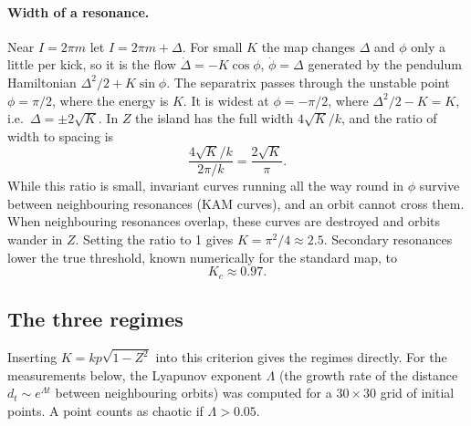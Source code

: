 \documentclass[11pt,a4paper]{article}
\begin{document}
\paragraph{Width of a resonance.}
Near $I=2\pi m$ let $I = 2\pi m + \Delta$. For small $K$ the map changes $\Delta$ and $\phi$ only a little per kick, so
it is the flow $\dot\Delta = -K\cos\phi$, $\dot\phi = \Delta$ generated by the pendulum Hamiltonian
$\Delta^2/2 + K\sin\phi$. The separatrix passes through the unstable point $\phi=\pi/2$, where the energy is $K$. It is
widest at $\phi=-\pi/2$, where $\Delta^2/2 - K = K$, i.e.\ $\Delta=\pm2\sqrt K$. In $Z$ the island has the full width
$4\sqrt K/k$, and the ratio of width to spacing is
\begin{equation}
  \frac{4\sqrt K/k}{2\pi/k} = \frac{2\sqrt K}{\pi}.
\end{equation}
While this ratio is small, invariant curves running all the way round in $\phi$ survive between neighbouring
resonances (KAM curves), and an orbit cannot cross them. When neighbouring resonances overlap, these curves are
destroyed and orbits wander in $Z$. Setting the ratio to 1 gives $K=\pi^2/4\approx2.5$. Secondary resonances lower the
true threshold, known numerically for the standard map, to
\begin{equation}
  K_c \approx 0.97 .
\end{equation}

\subsection{The three regimes}

Inserting $K = kp\sqrt{1-Z^2}$ into this criterion gives the regimes directly. For the measurements below, the
Lyapunov exponent $\Lambda$ (the growth rate of the distance $d_t\sim e^{\Lambda t}$ between neighbouring orbits) was
computed for a $30\times30$ grid of initial points. A point counts as chaotic if $\Lambda>0.05$.
\end{document}
